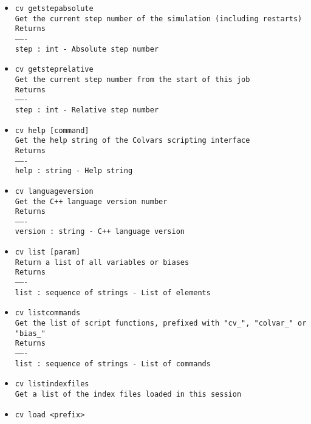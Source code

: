 \begin{itemize}
\item \texttt{cv getstepabsolute}
\\
\texttt{Get the current step number of the simulation (including restarts)}
\\
\texttt{Returns}
\\
\texttt{-------}
\\
\texttt{step : int - Absolute step number}
\item \texttt{cv getsteprelative}
\\
\texttt{Get the current step number from the start of this job}
\\
\texttt{Returns}
\\
\texttt{-------}
\\
\texttt{step : int - Relative step number}
\item \texttt{cv help [command]}
\\
\texttt{Get the help string of the Colvars scripting interface}
\\
\texttt{Returns}
\\
\texttt{-------}
\\
\texttt{help : string - Help string}
\item \texttt{cv languageversion}
\\
\texttt{Get the C++ language version number}
\\
\texttt{Returns}
\\
\texttt{-------}
\\
\texttt{version : string - C++ language version}
\item \texttt{cv list [param]}
\\
\texttt{Return a list of all variables or biases}
\\
\texttt{Returns}
\\
\texttt{-------}
\\
\texttt{list : sequence of strings - List of elements}
\item \texttt{cv listcommands}
\\
\texttt{Get the list of script functions, prefixed with "cv\_", "colvar\_" or "bias\_"}
\\
\texttt{Returns}
\\
\texttt{-------}
\\
\texttt{list : sequence of strings - List of commands}
\item \texttt{cv listindexfiles}
\\
\texttt{Get a list of the index files loaded in this session}
\item \texttt{cv load <prefix>}
\\

\end{itemize}
